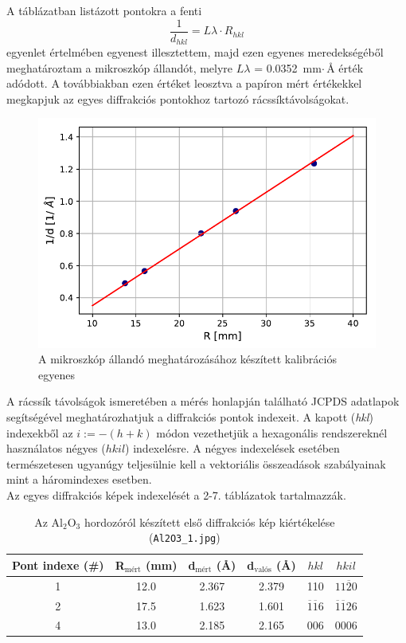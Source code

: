 \documentclass[12pt,a4paper]{article}
\begin{document}
\newline
\hspace*{10pt} A táblázatban listázott pontokra a fenti
\begin{equation}
\frac{1}{d_{hkl}} = L\lambda \cdot R_{hkl}
\end{equation}
egyenlet értelmében egyenest illesztettem, majd ezen egyenes meredekségéből meghatároztam a mikroszkóp állandót, melyre $L\lambda$ = 0.0352 $\textrm{mm}\cdot$\AA \hspace{3pt} érték adódott. A továbbiakban ezen értéket leosztva a papíron mért értékekkel megkapjuk az egyes diffrakciós pontokhoz tartozó rácssíktávolságokat.\\
\begin{figure}[!h]
\centering
\includegraphics[width=0.7\linewidth]{kalib}
\caption{A mikroszkóp állandó meghatározásához készített kalibrációs egyenes}
\label{fig:kalib}
\end{figure}
\newpage
A rácssík távolságok ismeretében a mérés honlapján található JCPDS adatlapok segítségével meghatározhatjuk a diffrakciós pontok indexeit. A kapott (\emph{hkl}) indexekből az $i:=-(h+k)$ módon vezethetjük a hexagonális rendszereknél használatos négyes ($hkil$) indexelésre. A négyes indexelések esetében természetesen ugyanúgy teljesülnie kell a vektoriális összeadások szabályainak mint a háromindexes esetben.\\
Az egyes diffrakciós képek indexelését a 2-7. táblázatok tartalmazzák.
\begin{table}[!h]
\begin{center}
\begin{tabular}{|c|c|c|c|c|c|}
\hline
Pont indexe (\#) & R$_{\textrm{mért}}$ (mm) & d$_{\textrm{mért}}$ (\AA) & d$_{\textrm{valós}}$ (\AA) & $hkl$ & $hkil$ \\
\hline
1 & 12.0 & 2.367 & 2.379 & 110 & $11\overline{2}0$ \\
\hline
2 & 17.5 & 1.623 & 1.601 & $\overline{1}\overline{1}6$ & $ \overline{1}\overline{1}26 $\\
\hline
4 & 13.0 & 2.185 & 2.165 & 006 & 0006\\
\hline
\end{tabular}
\caption{Az Al$_2$O$_3$ hordozóról készített első diffrakciós kép kiértékelése (\texttt{Al2O3\_1.jpg})}
\end{center}
\end{table}
\end{document}
